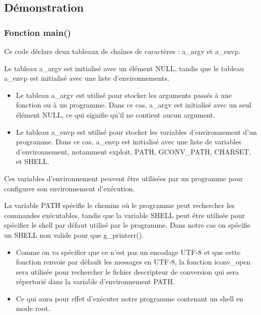 \documentclass[12pt,a4paper]{article}
\begin{document}
   		\subsection{Démonstration}
			\subsubsection{Fonction main()} 
			
             \begin{flushleft}
                \noindent Ce code déclare deux tableaux de chaînes de caractères : a\_argv et a\_envp. 
                \item Le tableau a\_argv est initialisé avec un élément NULL, tandis que le tableau a\_envp est initialisé avec une liste d'environnements.
                \begin{itemize}

                    \item Le tableau a\_argv est utilisé pour stocker les arguments passés à une fonction ou à un programme. Dans ce cas, a\_argv est initialisé avec un seul élément NULL, ce qui signifie qu'il ne contient aucun argument.
                    \item Le tableau a\_envp est utilisé pour stocker les variables d'environnement d'un programme. Dans ce cas, a\_envp est initialisé avec une liste de variables d'environnement, notamment exploit, PATH, GCONV\_PATH, CHARSET, et SHELL. 
                \end{itemize}
                \item Ces variables d'environnement peuvent être utilisées par un programme pour configurer son environnement d'exécution. 
                \item La variable PATH spécifie le chemins où le programme peut rechercher les commandes exécutables, tandis que la variable SHELL peut être utilisée pour spécifier le shell par défaut utilisé par le programme. Dans notre cas on spécifie un SHELL non valide pour que g\_printerr(). 
                \begin{itemize}
                     \item Comme on va spécifier que ce n'est pas un encodage UTF-8 et que cette fonction renvoie par défault les messages en UTF-8, la fonction iconv\_open sera utilisée pour rechercher le fichier descripteur de conversion qui sera répertorié dans la variable d'environnement PATH.
                \item Ce qui aura pour effet d'exécuter notre programme contenant un shell en mode root.
                \end{itemize}
               
            \end{flushleft}
\end{document}
